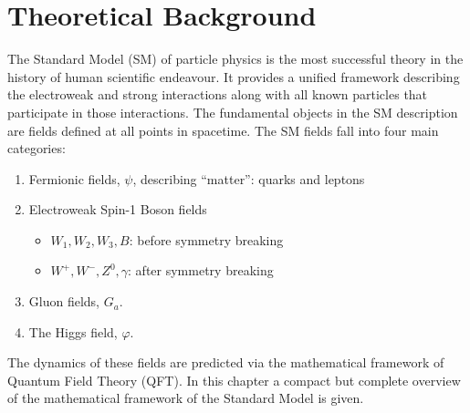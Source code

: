 \graphicspath{{Ch1_Theory/figures/}}

\chapter{Theoretical Background}

The Standard Model (SM) of particle physics is the most successful theory in the history of human scientific endeavour.
It provides a unified framework describing the electroweak and strong interactions along with all known particles that participate in those interactions.
The fundamental objects in the SM description are fields defined at all points in spacetime.
The SM fields fall into four main categories:


\begin{enumerate}
    \item Fermionic fields, $\psi$, describing ``matter'': quarks and leptons
    \item Electroweak Spin-1 Boson fields
        \begin{itemize}
            \item $W_1, W_2, W_3, B$: before symmetry breaking
            \item $W^+, W^-, Z^0, \gamma$: after symmetry breaking
        \end{itemize}
    \item Gluon fields, $G_a$.
    \item The Higgs field, $\varphi$.
\end{enumerate}

The dynamics of these fields are predicted via the mathematical framework of Quantum Field Theory (QFT).
In this chapter a compact but complete overview of the mathematical framework of the Standard Model is given.


